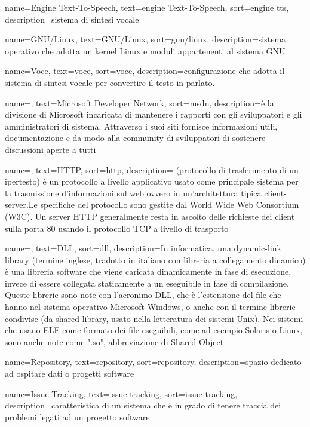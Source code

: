 {
	name=Engine Text-To-Speech,
	text=engine Text-To-Speech,
	sort=engine tts,
	description={sistema di sintesi vocale}
}

{
	name=GNU/Linux,
	text=GNU/Linux,
	sort=gnu/linux,
	description={sistema operativo che adotta un kernel Linux e moduli appartenenti al sistema GNU}
}

{
	name=Voce,
	text=voce,
	sort=voce,
	description={configurazione che adotta il sistema di sintesi vocale per convertire il testo in parlato.}
}

{
	name=,
	text=Microsoft Developer Network,
	sort=msdn,
	description={è la divisione di Microsoft incaricata di mantenere i rapporti con gli sviluppatori e gli amministratori di sistema. Attraverso i suoi siti fornisce informazioni utili, documentazione e da modo alla community di sviluppatori di sostenere discussioni aperte a tutti}
}

{
	name=,
	text=HTTP,
	sort=http,
	description={ (protocollo di trasferimento di un ipertesto) è un protocollo a livello applicativo usato come principale sistema per la trasmissione d'informazioni sul web ovvero in un'architettura tipica client-server.Le specifiche del protocollo sono gestite dal World Wide Web Consortium (W3C). Un server HTTP generalmente resta in ascolto delle richieste dei client sulla porta 80 usando il protocollo TCP a livello di trasporto}
}

{
	name=,
	text=DLL,
	sort=dll,
	description={In informatica, una dynamic-link library (termine inglese, tradotto in italiano con libreria a collegamento dinamico) è una libreria software che viene caricata dinamicamente in fase di esecuzione, invece di essere collegata staticamente a un eseguibile in fase di compilazione. Queste librerie sono note con l'acronimo DLL, che è l'estensione del file che hanno nel sistema operativo Microsoft Windows, o anche con il termine librerie condivise (da shared library, usato nella letteratura dei sistemi Unix). Nei sistemi che usano ELF come formato dei file eseguibili, come ad esempio Solaris o Linux, sono anche note come ".so", abbreviazione di Shared Object}
}

{
	name=Repository,
	text=repository,
	sort=repository,
	description={spazio dedicato ad ospitare dati o progetti software}
}

{
	name=Issue Tracking,
	text=issue tracking,
	sort=issue tracking,
	description={caratteristica di un sistema che è in grado di tenere traccia dei problemi legati ad un progetto software}
}

